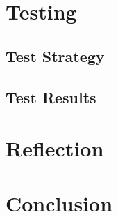 \documentclass[a4paper,11pt]{article}
\begin{document}
\pagebreak %


\pagebreak
\section{Testing}


\subsection{Test Strategy}


\subsection{Test Results}


\pagebreak


\pagebreak
\section{Reflection}


\pagebreak
\section{Conclusion}


\pagebreak


\pagebreak
\appendix

\end{document}
